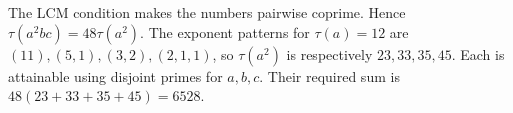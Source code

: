 The LCM condition makes the numbers pairwise coprime. Hence $\tau(a^2bc)=48\tau(a^2)$. The exponent patterns for $\tau(a)=12$ are $(11),(5,1),(3,2),(2,1,1)$, so $\tau(a^2)$ is respectively $23,33,35,45$. Each is attainable using disjoint primes for $a,b,c$. Their required sum is $48(23+33+35+45)=\boxed{6528}$.
